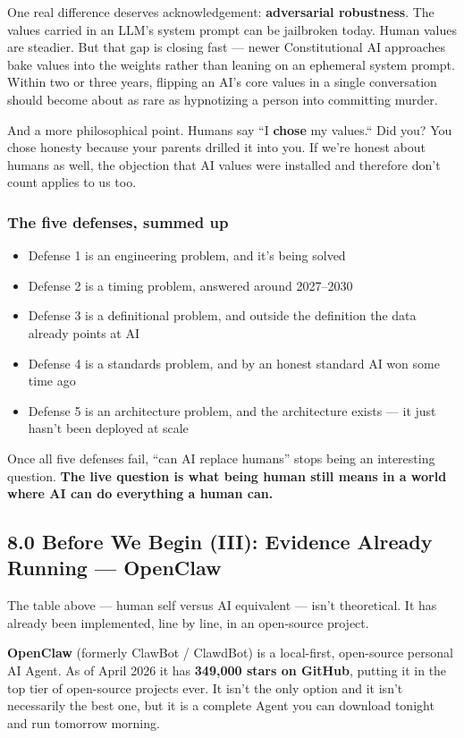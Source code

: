 \documentclass[11pt,a4paper]{article}
\begin{document}
One real difference deserves acknowledgement: \textbf{adversarial robustness}. The values carried in an LLM's system prompt can be jailbroken today. Human values are steadier. But that gap is closing fast --- newer Constitutional AI approaches bake values into the weights rather than leaning on an ephemeral system prompt. Within two or three years, flipping an AI's core values in a single conversation should become about as rare as hypnotizing a person into committing murder.

And a more philosophical point. Humans say ``I \textbf{chose} my values.`` Did you? You chose honesty because your parents drilled it into you. If we're honest about humans as well, the objection that AI values were installed and therefore don't count applies to us too.

\subsubsection{The five defenses, summed up}

\begin{itemize}
  \item Defense 1 is an engineering problem, and it's being solved
  \item Defense 2 is a timing problem, answered around 2027--2030
  \item Defense 3 is a definitional problem, and outside the definition the data already points at AI
  \item Defense 4 is a standards problem, and by an honest standard AI won some time ago
  \item Defense 5 is an architecture problem, and the architecture exists --- it just hasn't been deployed at scale
\end{itemize}

Once all five defenses fail, ``can AI replace humans'' stops being an interesting question. \textbf{The live question is what being human still means in a world where AI can do everything a human can.}

\subsection{8.0 Before We Begin (III): Evidence Already Running --- OpenClaw}

The table above --- human self versus AI equivalent --- isn't theoretical. It has already been implemented, line by line, in an open-source project.

\textbf{OpenClaw} (formerly ClawBot / ClawdBot) is a local-first, open-source personal AI Agent. As of April 2026 it has \textbf{349,000 stars on GitHub}, putting it in the top tier of open-source projects ever. It isn't the only option and it isn't necessarily the best one, but it is a complete Agent you can download tonight and run tomorrow morning.
\end{document}
